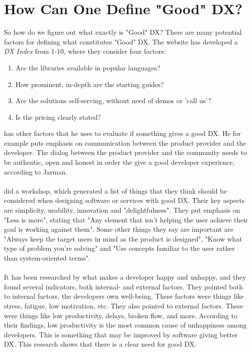 \documentclass{cslthse-msc}
\begin{document}
    \section{How Can One Define "Good" DX?}
    So how do we figure out what exactly is "Good" DX?
    There are many potential factors for defining what constitutes "Good"
    DX. The website \citet{everydeveloper} has developed a \textit{DX Index} from
    1-10, where they consider four factors:
    \begin{enumerate}
        \item Are the libraries available in popular languages?
        \item How prominent, in-depth are the starting guides?
        \item Are the solutions self-serving, without need of demos or 'call us'?
        \item Is the pricing clearly stated?
    \end{enumerate}
    \citet{jarman} has other factors that he uses to evaluate
    if something gives a good DX. He for example puts emphasis on
    communication between the product provider and the developer. The dialog
    between the product provider and the community needs to be authentic,
    open and honest in order the give a good developer experience, according
    to Jarman.
    \\ \\
    \citet{dhide} did a workshop, which generated a list of things that they think should be considered when designing software or services with good DX. Their key aspects are simplicity, usability, innovation and "delightfulness". They put emphasis on "Less is more", stating that "Any element that isn't helping the user achieve their goal is working against them". Some other things they say are important are "Always keep the target users in mind as the product is designed", "Know what type of problem you’re solving" and "Use concepts familiar to the user rather than system-oriented terms".
    \\ \\
    It has been researched by \citet{unhappy} what makes a developer
    happy and unhappy, and they found several indicators, both
    internal- and external factors. They pointed both to internal factors, the developers own well-being. These factors were things like stress, fatigue, low motivation, etc. They also pointed to external factors. These were things like low productivity, delays, broken flow, and more. According to their findings, low productivity is the most common cause of unhappiness among developers. This is something that may be improved by software giving better DX. This research shows that there is a clear need for good DX.
\end{document}
